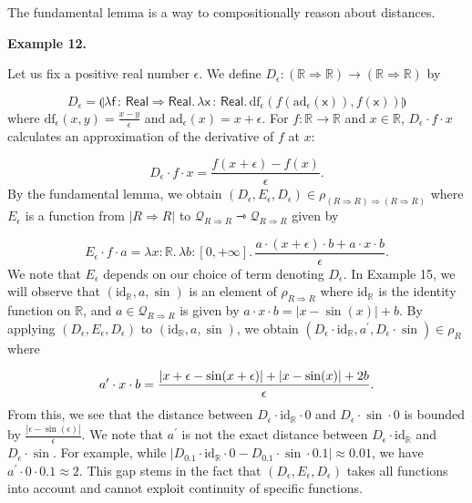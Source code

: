 \documentclass[10pt,a4paper]{amsart}
\begin{document}
 
The fundamental lemma is a way to compositionally reason about distances.\par
 
 
 
\par\medskip\noindent\textbf{Example 12.}\par
 
 
Let us fix a positive real number $\epsilon$. We define $D_{\epsilon}\colon(\mathbb{R}\Rightarrow\mathbb{R})\to(\mathbb{R}\Rightarrow%
\mathbb{R})$ by\par
    \[D_{\epsilon}=\llparenthesis\lambda\mathsf{f}\,{:}\,\mathsf{Real}\Rightarrow%
\mathsf{Real}.\,\lambda\mathsf{x}\,{:}\,\mathsf{Real}.\,\mathrm{df}_{\epsilon}%
(f(\mathrm{ad}_{\epsilon}(\mathsf{x})),f(\mathsf{x}))\rrparenthesis\]    
where $\mathrm{df}_{\epsilon}(x,y)=\frac{x-y}{\epsilon}$ and $\mathrm{ad}_{\epsilon}(x)=x+\epsilon$. For $f\colon\mathbb{R}\to\mathbb{R}$ and $x\in\mathbb{R}$, $D_{\epsilon}\cdot f\cdot x$ calculates an approximation of the derivative of $f$ at $x$:\par
    \[D_{\epsilon}\cdot f\cdot x=\frac{f(x+\epsilon)-f(x)}{\epsilon}.\]    
By the fundamental lemma, we obtain $(D_{\epsilon},E_{\epsilon},D_{\epsilon})\in\rho_{(R\Rightarrow R)\Rightarrow(R%
\Rightarrow R)}$ where $E_{\epsilon}$ is a function from $|R\Rightarrow R|$ to $\mathcal{Q}_{R\Rightarrow R}\rightarrowtriangle\mathcal{Q}_{R\Rightarrow R}$ given by\par
    \[E_{\epsilon}\cdot f\cdot a=\lambda x:\mathbb{R}.\,\lambda b:[0,+\infty].\,%
\frac{a\cdot(x+\epsilon)\cdot b+a\cdot x\cdot b}{\epsilon}.\]    
We note that $E_{\epsilon}$ depends on our choice of term denoting $D_{\epsilon}$. In Example 15, we will observe that $(\mathrm{id}_{\mathbb{R}},a,\sin)$ is an element of $\rho_{R\Rightarrow R}$ where $\mathrm{id}_{\mathbb{R}}$ is the identity function on $\mathbb{R}$, and $a\in\mathcal{Q}_{R\Rightarrow R}$ is given by $a\cdot x\cdot b=|x-\sin(x)|+b$. By applying $(D_{\epsilon},E_{\epsilon},D_{\epsilon})$ to $(\mathrm{id}_{\mathbb{R}},a,\sin)$, we obtain $(D_{\epsilon}\cdot\mathrm{id}_{\mathbb{R}},a^{\prime},D_{\epsilon}\cdot\sin)%
\in\rho_{R}$ where\par
    \[a^{\prime}\cdot x\cdot b=\frac{|x+\epsilon-\sin(x+\epsilon)|+|x-\sin(x)|+2b}{%
\epsilon}.\]    
From this, we see that the distance between $D_{\epsilon}\cdot\mathrm{id}_{\mathbb{R}}\cdot 0$ and $D_{\epsilon}\cdot{\sin}\cdot 0$ is bounded by $\frac{|\epsilon-\sin(\epsilon)|}{\epsilon}$. We note that $a^{\prime}$ is not the exact distance between $D_{\epsilon}\cdot\mathrm{id}_{\mathbb{R}}$ and $D_{\epsilon}\cdot\sin$. For example, while $|D_{0.1}\cdot\mathrm{id}_{\mathbb{R}}\cdot 0-D_{0.1}\cdot{\sin}\cdot 0.1|%
\approx 0.01$, we have $a^{\prime}\cdot 0\cdot 0.1\approx 2$. This gap stems in the fact that $(D_{\epsilon},E_{\epsilon},D_{\epsilon})$ takes all functions into account and cannot exploit continuity of specific functions.\par
 
\end{document}
